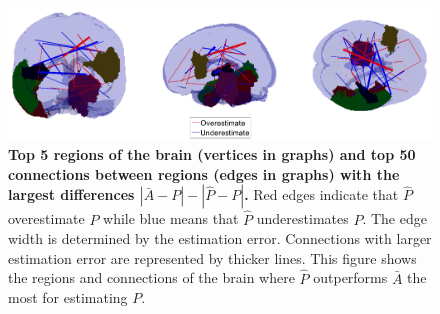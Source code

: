 \documentclass[10pt,letterpaper]{article}
\renewcommand{\hat}{\widehat}
\begin{document}
\begin{figure}[!htb]
\centering
\includegraphics[width=1\textwidth]{Diff_between_desikan.png}
\caption{{\bf Top 5 regions of the brain (vertices in graphs) and top 50 connections between regions (edges in graphs) with the largest differences $|\bar{A} - P| - |\hat{P} - P|$.}
Red edges indicate that $\hat{P}$ overestimate $P$ while blue means that $\hat{P}$ underestimates $P$. The edge width is determined by the estimation error. Connections with larger estimation error are represented by thicker lines. This figure shows the regions and connections of the brain where $\hat{P}$ outperforms $\bar{A}$ the most for estimating $P$.}
\label{fig:Diff_between_desikan}
\end{figure}
\end{document}
